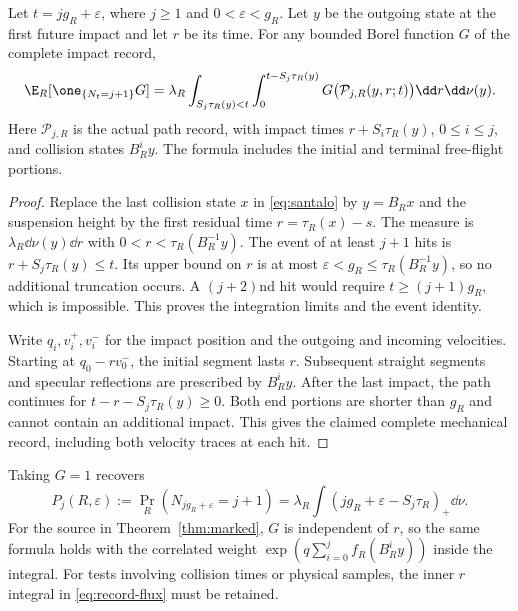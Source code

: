 \begin{proposition}\label{prop:marked-flux}
Let $t=jg_R+\varepsilon$, where $j\ge1$ and
$0<\varepsilon<g_R$. Let $y$ be the outgoing state at the first future
impact and let $r$ be its time. For any bounded Borel function $G$ of the
complete impact record,
\begin{equation}\label{eq:record-flux}
 \E_R[\one_{\{N_t=j+1\}}G]
 =\lambda_R\int_{S_j\tau_R(y)<t}
       \int_0^{t-S_j\tau_R(y)}
       G\bigl(\mathcal P_{j,R}(y,r;t)\bigr)\dd r\dd\nu(y).
\end{equation}
Here $\mathcal P_{j,R}$ is the actual path record, with impact times
$r+S_i\tau_R(y)$, $0\le i\le j$, and collision states $B_R^iy$.
The formula includes the initial and terminal free-flight portions.
\end{proposition}
\begin{proof}
Replace the last collision state $x$ in \eqref{eq:santalo} by $y=B_Rx$
and the suspension height by the first residual time
$r=\tau_R(x)-s$. The measure is $\lambda_R\dd\nu(y)\dd r$ with
$0<r<\tau_R(B_R^{-1}y)$. The event of at least $j+1$ hits is
$r+S_j\tau_R(y)\le t$. Its upper bound on $r$ is at most
$\varepsilon<g_R\le\tau_R(B_R^{-1}y)$, so no additional truncation
occurs. A $(j+2)$nd hit would require $t\ge(j+1)g_R$, which is
impossible. This proves the integration limits and the event identity.

Write $q_i,v_i^+,v_i^-$ for the impact position and the outgoing and
incoming velocities. Starting at $q_0-rv_0^-$, the initial segment lasts
$r$. Subsequent straight segments and specular reflections are prescribed
by $B_R^iy$. After the last impact, the path continues for
$t-r-S_j\tau_R(y)\ge0$. Both end portions are shorter than $g_R$ and
cannot contain an additional impact. This gives the claimed complete
mechanical record, including both velocity traces at each hit.
\end{proof}

Taking $G=1$ recovers
\begin{equation}\label{eq:Aj}
 P_j(R,\varepsilon):=\Pr_R(N_{jg_R+\varepsilon}=j+1)
   =\lambda_R\int(jg_R+\varepsilon-S_j\tau_R)_+\dd\nu.
\end{equation}
For the source in Theorem~\ref{thm:marked}, $G$ is independent of $r$,
so the same formula holds with the correlated weight
$\exp(q\sum_{i=0}^j f_R(B_R^iy))$ inside the integral. For tests
involving collision times or physical samples, the inner $r$ integral
in \eqref{eq:record-flux} must be retained.
